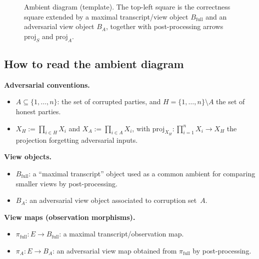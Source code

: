 \documentclass[11pt,a4paper]{article}
\theoremstyle{definition}
\theoremstyle{plain}
\begin{document}
\begin{figure}[ht]
\centering
{}
\caption{Ambient diagram (template). The top-left square is the correctness square extended by a maximal transcript/view object $B_{\mathrm{full}}$ and an adversarial view object $B_A$, together with post-processing arrows $\mathrm{proj}_S$ and $\mathrm{proj}_A$.}
\label{fig:master-diagram}
\end{figure}

\subsection{How to read the ambient diagram}
\label{subsec:ambient-diagram-legend-embeddings-note}

\textbf{Adversarial conventions.}
\begin{itemize}
    \item $A \subseteq \{1, \ldots, n\}$: the set of corrupted parties, and $H = \{1, \ldots, n\} \setminus A$ the set of honest parties.
    \item $X_H := \prod_{i \in H} X_i$ and $X_A := \prod_{i \in A} X_i$, with $\mathrm{proj}_{X_H}: \prod_{i=1}^n X_i \to X_H$ the projection forgetting adversarial inputs.
\end{itemize}

\textbf{View objects.}
\begin{itemize}
    \item $B_{\mathrm{full}}$: a ``maximal transcript'' object used as a common ambient for comparing smaller views by post-processing.
    \item $B_A$: an adversarial view object associated to corruption set~$A$.
\end{itemize}

\textbf{View maps (observation morphisms).}
\begin{itemize}
    \item $\pi_{\mathrm{full}}: E \to B_{\mathrm{full}}$: a maximal transcript/observation map.
    \item $\pi_A:E\to B_A$: an adversarial view map obtained from $\pi_{\mathrm{full}}$ by post-processing.
\end{itemize}
\end{document}
